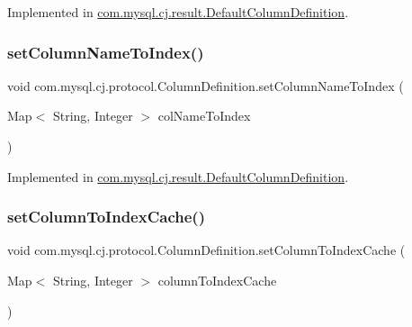 Implemented in \mbox{\hyperlink{classcom_1_1mysql_1_1cj_1_1result_1_1_default_column_definition_acf4c5671472b2d95e2ca7e8600a58999}{com.\+mysql.\+cj.\+result.\+Default\+Column\+Definition}}.

\mbox{\label{interfacecom_1_1mysql_1_1cj_1_1protocol_1_1_column_definition_a9294ea39f51afb604fa3579338bfa671}} 
\subsubsection{\texorpdfstring{set\+Column\+Name\+To\+Index()}{setColumnNameToIndex()}}
{\footnotesize\ttfamily void com.\+mysql.\+cj.\+protocol.\+Column\+Definition.\+set\+Column\+Name\+To\+Index (\begin{DoxyParamCaption}\item[{Map$<$ String, Integer $>$}]{col\+Name\+To\+Index }\end{DoxyParamCaption})}



Implemented in \mbox{\hyperlink{classcom_1_1mysql_1_1cj_1_1result_1_1_default_column_definition_ab28ab9fcc3e8ca10cbc6c0bc511efa29}{com.\+mysql.\+cj.\+result.\+Default\+Column\+Definition}}.

\mbox{\label{interfacecom_1_1mysql_1_1cj_1_1protocol_1_1_column_definition_a1972ecc1b6610bbb394af09827c4643f}} 
\subsubsection{\texorpdfstring{set\+Column\+To\+Index\+Cache()}{setColumnToIndexCache()}}
{\footnotesize\ttfamily void com.\+mysql.\+cj.\+protocol.\+Column\+Definition.\+set\+Column\+To\+Index\+Cache (\begin{DoxyParamCaption}\item[{Map$<$ String, Integer $>$}]{column\+To\+Index\+Cache }\end{DoxyParamCaption})}



